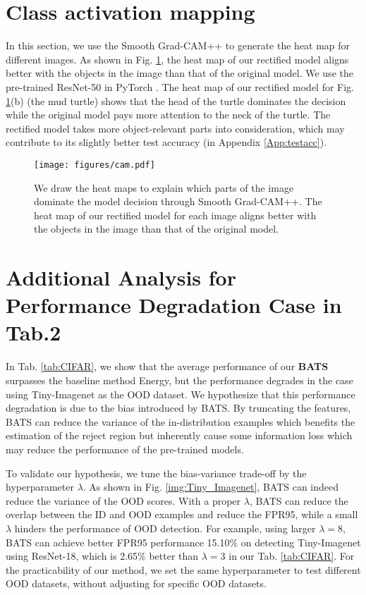 \documentclass{article}
\begin{document}
\section{Class activation mapping}\label{App:activation}

In this section, we use the Smooth Grad-CAM++\cite{omeiza2019smooth} to generate the heat map for different images. As shown in Fig. \ref{img:cam}, the heat map of our rectified model aligns better with the objects in the image than that of the original model. We use the pre-trained ResNet-50 in PyTorch \cite{pytorch}. The heat map of our rectified model for Fig. \ref{img:cam}(b) (the mud turtle) shows that the head of the turtle dominates the decision while the original model pays more attention to the neck of the turtle. The rectified model takes more object-relevant parts into consideration, which may contribute to its slightly better test accuracy (in Appendix \ref{App:testacc}).

\begin{figure}[htbp]
\centering
\texttt{[image: figures/cam.pdf]}
\caption{We draw the heat maps to explain which parts of the image dominate the model decision through Smooth Grad-CAM++\cite{omeiza2019smooth}. The heat map of our rectified model for each image aligns better with the objects in the image than that of the original model. }
\label{img:cam}
\end{figure}

{
\section{Additional Analysis for Performance Degradation Case in Tab.2}\label{App:Degradation}
 In Tab. \ref{tab:CIFAR}, we show that the average performance of our \textbf{BATS} surpasses the baseline method Energy, but the performance degrades in the case using Tiny-Imagenet as the OOD dataset.
 We hypothesize that this performance degradation is due to the bias introduced by BATS. By truncating the features, BATS can reduce the variance of the in-distribution examples which benefits the estimation of the reject region but inherently cause some information loss which may reduce the performance of the pre-trained models. 
 
 To validate our hypothesis, we tune the bias-variance trade-off by the hyperparameter $\lambda$.
 As shown in Fig. \ref{img:Tiny_Imagenet}, BATS can indeed reduce the variance of the OOD scores. With a proper $\lambda$, BATS can reduce the overlap between the ID and OOD examples and reduce the FPR95, while a small $\lambda$ hinders the performance of OOD detection. For example, using larger $\lambda=8$, BATS can achieve better FPR95 performance 15.10$\%$ on detecting Tiny-Imagenet using ResNet-18, which is 2.65$\%$ better than $\lambda=3$ in our Tab. \ref{tab:CIFAR}. For the practicability of our method, we set the same hyperparameter to test different OOD datasets, without adjusting for specific OOD datasets.
 }
 
\end{document}
